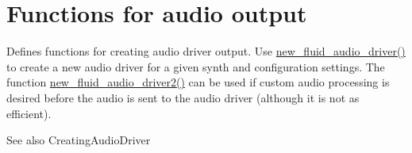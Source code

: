 \hypertarget{group__AudioFunctions}{}\section{Functions for audio output}
\label{group__AudioFunctions}
Defines functions for creating audio driver output. Use \hyperlink{audio_8h_a4ad51317b10b89bfe94ade5db345864b}{new\+\_\+fluid\+\_\+audio\+\_\+driver()} to create a new audio driver for a given synth and configuration settings. The function \hyperlink{audio_8h_a3959d8add1dea97e507a5ea2c802c0bc}{new\+\_\+fluid\+\_\+audio\+\_\+driver2()} can be used if custom audio processing is desired before the audio is sent to the audio driver (although it is not as efficient).

\begin{DoxySeeAlso}{See also}
Creating\+Audio\+Driver 
\end{DoxySeeAlso}
